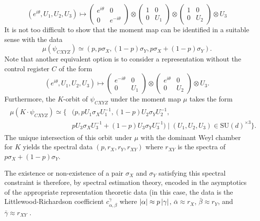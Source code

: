 \documentclass[notitlepage]{article}
\begin{document}
\begin{equation}
    (e^{i \theta}, U_1, U_2, U_3) \mapsto \begin{pmatrix} e^{i\theta} & 0 \\ 0 & e^{-i\theta} \end{pmatrix} \otimes \begin{pmatrix} 1 & 0 \\ 0 & U_1 \end{pmatrix} \otimes \begin{pmatrix} 1 & 0 \\ 0 & U_2 \end{pmatrix} \otimes U_3
\end{equation}
It is not too difficult to show that the moment map can be identified in a suitable sense with the data
\begin{equation}
    \mu(\psi_{CXYZ}) \simeq (p, p\sigma_X, (1-p)\sigma_Y, p\sigma_X + (1-p)\sigma_Y).
\end{equation}
Note that another equivalent option is to consider a representation without the control register $C$ of the form
\begin{equation}
    (e^{i \theta}, U_1, U_2, U_3) \mapsto \begin{pmatrix} e^{-i\theta} & 0 \\ 0 & U_1 \end{pmatrix} \otimes \begin{pmatrix} e^{i\theta} & 0 \\ 0 & U_2 \end{pmatrix} \otimes U_3.
\end{equation}
Furthermore, the $K$-orbit of $\psi_{CXYZ}$ under the moment map $\mu$ takes the form
\begin{align}
    \begin{split}
        \mu(K\cdot \psi_{CXYZ}) \simeq \{&(p, pU_1\sigma_XU_1^{-1}, (1-p)U_2\sigma_YU_2^{-1},\\& pU_3\sigma_XU_3^{-1} + (1-p)U_3\sigma_YU_3^{-1}) \mid (U_1,U_2,U_3) \in \mathrm{SU}(d)^{\times 3} \}.
    \end{split}
\end{align}
The unique intersection of this orbit under $\mu$ with the dominant Weyl chamber for $K$ yields the spectral data $(p, r_{X}, r_{Y}, r_{XY})$ where $r_{XY}$ is the spectra of $p \sigma_X + (1-p) \sigma_Y$.

The existence or non-existence of a pair $\sigma_X$ and $\sigma_Y$ satisfying this spectral constraint is therefore, by spectral estimation theory, encoded in the asymptotics of the appropriate representation theoretic data (in this case, the data is the Littlewood-Richardson coefficient $c_{\alpha,\beta}^{\gamma}$ where $\left|\alpha\right| \approx p \left|\gamma\right|$, $\bar \alpha \approx r_X$, $\bar \beta \approx r_Y$, and $\bar \gamma \approx r_{XY}$ \cite{christandl2008quantum}.
\end{document}
